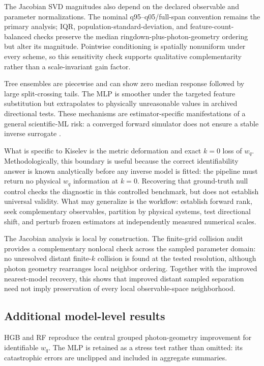 \documentclass[11pt]{article}
\newcommand{\wq}{w_q}
\begin{document}
The Jacobian SVD magnitudes also depend on the declared observable and parameter
normalizations. The nominal q95--q05/full-span convention remains the
primary analysis; IQR, population-standard-deviation, and feature-count-balanced
checks preserve the median ringdown-plus-photon-geometry ordering but alter its
magnitude. Pointwise conditioning is spatially nonuniform under every scheme,
so this sensitivity check supports qualitative complementarity rather than a
scale-invariant gain factor.

Tree ensembles are piecewise and can show zero median response followed by
large split-crossing tails. The MLP is smoother under the targeted feature
substitution but extrapolates to physically unreasonable values in archived
directional tests. These mechanisms are estimator-specific manifestations of a
general scientific-ML risk: a converged forward simulator does not ensure a
stable inverse surrogate \cite{ovadia2019uncertainty,koh2021wilds,psaros2023uq}.

What is specific to Kiselev is the metric deformation and exact $k=0$ loss of
$\wq$. Methodologically, this boundary is useful because the correct
identifiability answer is known analytically before any inverse model is fitted:
the pipeline must return no physical $\wq$ information at $k=0$. Recovering that
ground-truth null control checks the diagnostic in this controlled benchmark,
but does not establish universal validity. What may generalize is the workflow:
establish forward rank, seek complementary observables, partition by physical
systems, test directional shift, and perturb frozen estimators at independently
measured numerical scales.

The Jacobian analysis is local by construction. The finite-grid collision
audit provides a complementary nonlocal check across the sampled parameter
domain: no unresolved distant finite-$k$ collision is found at the tested
resolution, although photon geometry rearranges local neighbor ordering.
Together with the improved nearest-model recovery, this shows that improved
distant sampled separation need not imply preservation of every local
observable-space neighborhood.



\subsection{Additional model-level results}
HGB and RF reproduce the central grouped photon-geometry improvement for
identifiable $\wq$. The MLP is retained as a stress test rather than omitted:
its catastrophic errors are unclipped and included in aggregate summaries.
\end{document}
